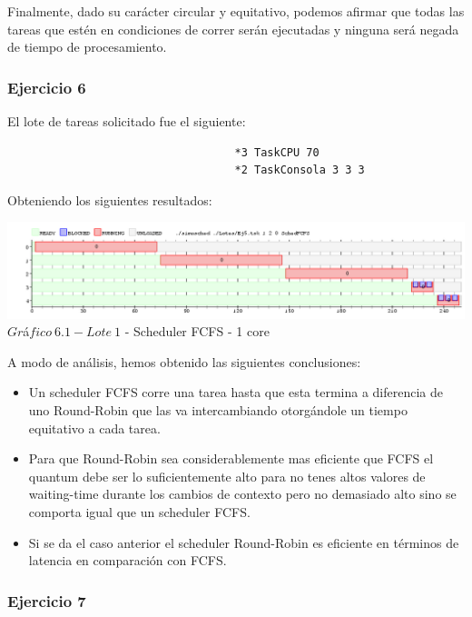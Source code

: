 \indent Finalmente, dado su carácter circular y equitativo, podemos afirmar que todas las tareas que 
estén en condiciones de correr serán ejecutadas y ninguna será negada de tiempo de procesamiento.\\


\subsubsection[Resolución Ejercicio 6]{Ejercicio 6}

El lote de tareas solicitado fue el siguiente:
\begin{verbatim}
                                   *3 TaskCPU 70
                                   *2 TaskConsola 3 3 3
\end{verbatim}

Obteniendo los siguientes resultados:

\begin{center}
  	\includegraphics[width=450pt]{ej6.png}
	  {$Gr$\'a$fico \ 6.1 - Lote \ 1$ - Scheduler FCFS - 1 core}	
\end{center}

\indent A modo de an\'alisis, hemos obtenido las siguientes conclusiones:\\


\begin{itemize}
 \item Un scheduler FCFS corre una tarea hasta que esta termina a diferencia de uno Round-Robin 
que las va intercambiando otorg\'{a}ndole un tiempo equitativo a cada tarea.
\item Para que Round-Robin sea considerablemente mas eficiente que FCFS el quantum debe ser 
lo suficientemente alto para no tenes altos valores de waiting-time durante los cambios de 
contexto pero no demasiado alto sino se comporta igual que un scheduler FCFS.
\item Si se da el caso anterior el scheduler Round-Robin es eficiente en t\'{e}rminos 
de latencia en comparaci\'{o}n con FCFS.
\end{itemize}


\subsubsection[Resolución Ejercicio 7]{Ejercicio 7}

